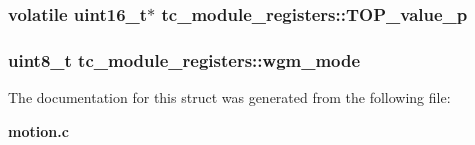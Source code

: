 \subsubsection[{T\+O\+P\+\_\+value\+\_\+p}]{\setlength{\rightskip}{0pt plus 5cm}volatile uint16\+\_\+t$\ast$ tc\+\_\+module\+\_\+registers\+::\+T\+O\+P\+\_\+value\+\_\+p}\label{structtc__module__registers_ac0a10e603c390e7ca6ff3935ad364a00}
\subsubsection[{wgm\+\_\+mode}]{\setlength{\rightskip}{0pt plus 5cm}uint8\+\_\+t tc\+\_\+module\+\_\+registers\+::wgm\+\_\+mode}\label{structtc__module__registers_a272a3b5aca6bb0aa2190d4f60d979783}


The documentation for this struct was generated from the following file\+:\begin{DoxyCompactItemize}
\item 
{\bf motion.\+c}\end{DoxyCompactItemize}
